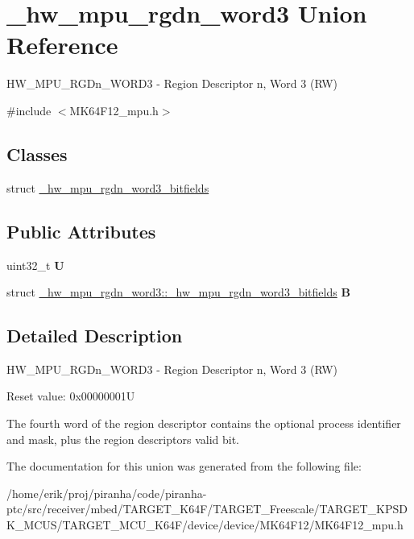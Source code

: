 \hypertarget{union__hw__mpu__rgdn__word3}{}\section{\+\_\+hw\+\_\+mpu\+\_\+rgdn\+\_\+word3 Union Reference}
\label{union__hw__mpu__rgdn__word3}


H\+W\+\_\+\+M\+P\+U\+\_\+\+R\+G\+Dn\+\_\+\+W\+O\+R\+D3 -\/ Region Descriptor n, Word 3 (RW)  




{\ttfamily \#include $<$M\+K64\+F12\+\_\+mpu.\+h$>$}

\subsection*{Classes}
\begin{DoxyCompactItemize}
\item 
struct \hyperlink{struct__hw__mpu__rgdn__word3_1_1__hw__mpu__rgdn__word3__bitfields}{\+\_\+hw\+\_\+mpu\+\_\+rgdn\+\_\+word3\+\_\+bitfields}
\end{DoxyCompactItemize}
\subsection*{Public Attributes}
\begin{DoxyCompactItemize}
\item 
uint32\+\_\+t {\bfseries U}\hypertarget{union__hw__mpu__rgdn__word3_a0c133ab76094d3d16e09a7f744c5ddfc}{}\label{union__hw__mpu__rgdn__word3_a0c133ab76094d3d16e09a7f744c5ddfc}

\item 
struct \hyperlink{struct__hw__mpu__rgdn__word3_1_1__hw__mpu__rgdn__word3__bitfields}{\+\_\+hw\+\_\+mpu\+\_\+rgdn\+\_\+word3\+::\+\_\+hw\+\_\+mpu\+\_\+rgdn\+\_\+word3\+\_\+bitfields} {\bfseries B}\hypertarget{union__hw__mpu__rgdn__word3_a0fc9a8ebd9406cdf29411a94fe5a804b}{}\label{union__hw__mpu__rgdn__word3_a0fc9a8ebd9406cdf29411a94fe5a804b}

\end{DoxyCompactItemize}


\subsection{Detailed Description}
H\+W\+\_\+\+M\+P\+U\+\_\+\+R\+G\+Dn\+\_\+\+W\+O\+R\+D3 -\/ Region Descriptor n, Word 3 (RW) 

Reset value\+: 0x00000001U

The fourth word of the region descriptor contains the optional process identifier and mask, plus the region descriptor\textquotesingle{}s valid bit. 

The documentation for this union was generated from the following file\+:\begin{DoxyCompactItemize}
\item 
/home/erik/proj/piranha/code/piranha-\/ptc/src/receiver/mbed/\+T\+A\+R\+G\+E\+T\+\_\+\+K64\+F/\+T\+A\+R\+G\+E\+T\+\_\+\+Freescale/\+T\+A\+R\+G\+E\+T\+\_\+\+K\+P\+S\+D\+K\+\_\+\+M\+C\+U\+S/\+T\+A\+R\+G\+E\+T\+\_\+\+M\+C\+U\+\_\+\+K64\+F/device/device/\+M\+K64\+F12/M\+K64\+F12\+\_\+mpu.\+h\end{DoxyCompactItemize}
